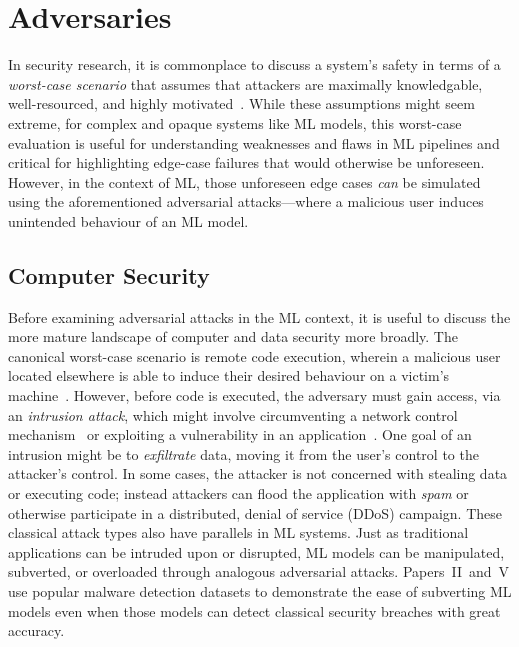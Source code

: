 \chapter{Adversaries}
\label{ch:adversaries}

In security research, it is commonplace to discuss a system's safety in terms of a \textit{worst-case scenario} that assumes that attackers are maximally knowledgable, well-resourced, and highly motivated~\cite{nist_antivirus}. 
While these assumptions might seem extreme, for complex and opaque systems like ML models, this worst-case evaluation is useful for understanding weaknesses and flaws in ML pipelines and critical for highlighting edge-case failures that would otherwise be unforeseen.
However, in the context of ML, those unforeseen edge cases \textit{can} be simulated using the aforementioned adversarial attacks---where a malicious user induces unintended behaviour of an ML model.

\section{Computer Security}

Before examining adversarial attacks in the ML context, it is useful to discuss the more mature landscape of computer and data security more broadly. 
The canonical worst-case scenario is remote code execution, wherein a malicious user located elsewhere is able to induce their desired behaviour on a victim's machine~\cite{nist_antivirus}. 
However, before code is executed, the adversary must gain access, via an \textit{intrusion attack}, which might involve circumventing a network control mechanism~\cite{firewallvuln} or exploiting a vulnerability in an application~\cite{injectionattack}.
One goal of an intrusion might be to \textit{exfiltrate} data, moving it from the user's control to the attacker's control.
In some cases, the attacker is not concerned with stealing data or executing code; instead attackers can flood the application with \textit{spam} or otherwise participate in a distributed, denial of service (DDoS) campaign.
These classical attack types also have parallels in ML systems. 
Just as traditional applications can be intruded upon or disrupted, ML models can be manipulated, subverted, or overloaded through analogous adversarial attacks. 
Papers~II~and~V use popular malware detection datasets to demonstrate the ease of subverting ML models even when those models can detect classical security breaches with great accuracy. 

